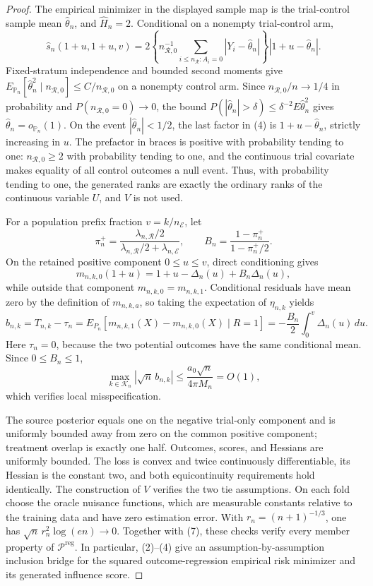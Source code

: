 \documentclass{article}
\begin{document}
\begin{proof}
The empirical minimizer in the displayed sample map is the trial-control sample mean \(\widehat\theta_n\), and \(\widehat H_n=2\).  Conditional on a nonempty trial-control arm,
\[
 \widehat s_n(1+u,1+u,v)
 =2\left\{n_{\mathcal R,0}^{-1}
   \sum_{i\leq n_{\mathcal R}:A_i=0}|Y_i-\widehat\theta_n|\right\}
   |1+u-\widehat\theta_n|.
\tag{4}
\]
Fixed-stratum independence and bounded second moments give \(E_{\mathbb P_n}[\widehat\theta_n^2\mid n_{\mathcal R,0}]\leq C/n_{\mathcal R,0}\) on a nonempty control arm.  Since \(n_{\mathcal R,0}/n\to1/4\) in probability and \(P(n_{\mathcal R,0}=0)\to0\), the bound \(P(|\widehat\theta_n|>\delta)\leq\delta^{-2}E\widehat\theta_n^2\) gives \(\widehat\theta_n=o_{\mathbb P_n}(1)\).  On the event \(|\widehat\theta_n|<1/2\), the last factor in (4) is \(1+u-\widehat\theta_n\), strictly increasing in \(u\).  The prefactor in braces is positive with probability tending to one: \(n_{\mathcal R,0}\geq2\) with probability tending to one, and the continuous trial covariate makes equality of all control outcomes a null event.  Thus, with probability tending to one, the generated ranks are exactly the ordinary ranks of the continuous variable \(U\), and \(V\) is not used.

For a population prefix fraction \(v=k/n_{\mathcal E}\), let
\[
 \pi_n^+=\frac{\lambda_{n,\mathcal R}/2}
 {\lambda_{n,\mathcal R}/2+\lambda_{n,\mathcal E}},
 \qquad
 B_n=\frac{1-\pi_n^+}{1-\pi_n^+/2}.
\]
On the retained positive component \(0\leq u\leq v\), direct conditioning gives
\[
 m_{n,k,0}(1+u)
 =1+u-\Delta_n(u)+B_n\Delta_n(u),
\tag{5}
\]
while outside that component \(m_{n,k,0}=m_{n,k,1}\).  Conditional residuals have mean zero by the definition of \(m_{n,k,a}\), so taking the expectation of \(\eta_{n,k}\) yields
\[
 b_{n,k}=T_{n,k}-\tau_n
 =E_{P_n}[m_{n,k,1}(X)-m_{n,k,0}(X)\mid R=1]
 =-\frac{B_n}{2}\int_0^v\Delta_n(u)\,du.
\tag{6}
\]
Here \(\tau_n=0\), because the two potential outcomes have the same conditional mean.  Since \(0\leq B_n\leq1\),
\[
 \max_{k\in\mathcal K_n}|\sqrt n\,b_{n,k}|
 \leq\frac{a_0\sqrt n}{4\pi M_n}=O(1),
\tag{7}
\]
which verifies local misspecification.

The source posterior equals one on the negative trial-only component and is uniformly bounded away from zero on the common positive component; treatment overlap is exactly one half.  Outcomes, scores, and Hessians are uniformly bounded.  The loss is convex and twice continuously differentiable, its Hessian is the constant two, and both equicontinuity requirements hold identically.  The construction of \(V\) verifies the two tie assumptions.  On each fold choose the oracle nuisance functions, which are measurable constants relative to the training data and have zero estimation error.  With \(r_n=(n+1)^{-1/3}\), one has \(\sqrt n\,r_n^2\log(en)\to0\).  Together with (7), these checks verify every member property of \(\mathcal P^{\mathrm{reg}}\).  In particular, (2)--(4) give an assumption-by-assumption inclusion bridge for the squared outcome-regression empirical risk minimizer and its generated influence score.


\end{proof}
\end{document}
